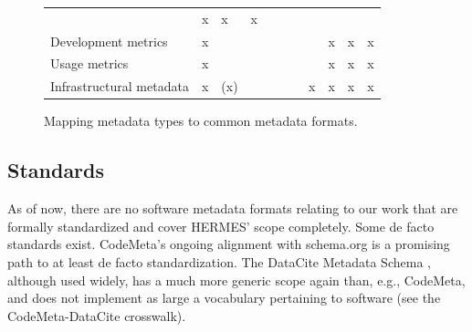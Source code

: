 \documentclass{article}
\begin{document}
\begin{figure}
\begin{tabular}{lllllllllll}
& x

& x

& x

\\
Development metrics

& x

& 

& 

& 

& 

& 

& 

& x

& x

& x

\\
Usage metrics

& x

& 

& 

& 

& 

& 

& 

& x

& x

& x

\\
Infrastructural metadata

& x

& (x)

& 

& 

& 

& 

& x

& x

& x

& x

\\
\end{tabular}
\caption{Mapping metadata types to common metadata formats.}
\label{y2o46dfd3ike}
\end{figure}

\subsection{Standards}\label{subsec:metadata-standards}
As of now, there are no software metadata formats relating to our work that are formally standardized and cover HERMES’ scope completely. Some de facto standards exist. CodeMeta’s ongoing alignment with schema.org is a promising path to at least de facto standardization. The DataCite Metadata Schema \cite{138880/AJSS9RWC}, although used widely, has a much more generic scope again than, e.g., CodeMeta, and does not implement as large a vocabulary pertaining to software (see the CodeMeta-DataCite crosswalk).
\end{document}
